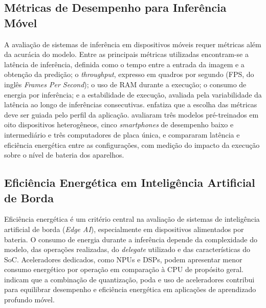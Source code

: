 \documentclass[artigo,times,capa]{iftex2024}
\begin{document}
\subsection{Métricas de Desempenho para Inferência Móvel}
 
A avaliação de sistemas de inferência em dispositivos móveis requer métricas além da acurácia do modelo. Entre as principais métricas utilizadas encontram-se a latência de inferência, definida como o tempo entre a entrada da imagem e a obtenção da predição; o \textit{throughput}, expresso em quadros por segundo (FPS, do inglês \textit{Frames Per Second}); o uso de \ac{RAM} durante a execução; o consumo de energia por inferência; e a estabilidade de execução, avaliada pela variabilidade da latência ao longo de inferências consecutivas. \textcite{Menghani2023Efficient} enfatiza que a escolha das métricas deve ser guiada pelo perfil da aplicação. \textcite{Hirsch2025Exploring} avaliaram três modelos pré-treinados em oito dispositivos heterogêneos, cinco \textit{smartphones} de desempenho baixo e intermediário e três computadores de placa única, e compararam latência e eficiência energética entre as configurações, com medição do impacto da execução sobre o nível de bateria dos aparelhos.
 
\subsection{Eficiência Energética em Inteligência Artificial de Borda}
 
Eficiência energética é um critério central na avaliação de sistemas de inteligência artificial de borda (\textit{Edge AI}), especialmente em dispositivos alimentados por bateria. O consumo de energia durante a inferência depende da complexidade do modelo, das operações realizadas, do \textit{delegate} utilizado e das características do \ac{SoC}. Aceleradores dedicados, como \acp{NPU} e \acp{DSP}, podem apresentar menor consumo energético por operação em comparação à \ac{CPU} de propósito geral. \textcite{Zhao2022A} indicam que a combinação de quantização, poda e uso de aceleradores contribui para equilibrar desempenho e eficiência energética em aplicações de aprendizado profundo móvel.
\end{document}
